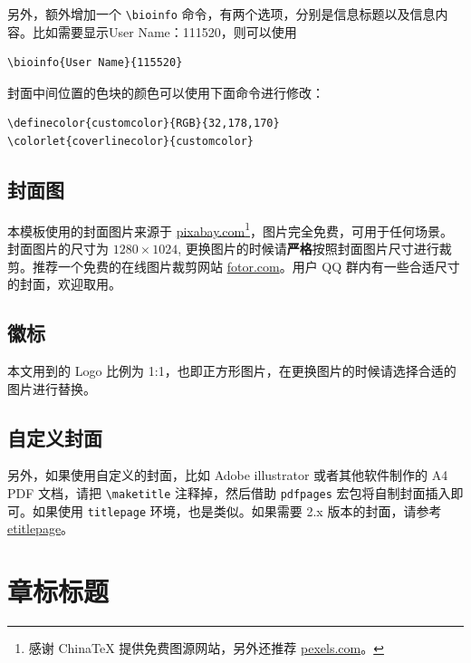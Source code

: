 \documentclass[lang=cn,newtx,10pt,scheme=chinese]{elegantbook}
\begin{document}
另外，额外增加一个 \lstinline{\bioinfo} 命令，有两个选项，分别是信息标题以及信息内容。比如需要显示{\kaishu User Name：111520}，则可以使用 
\begin{lstlisting}
\bioinfo{User Name}{115520}
\end{lstlisting}

封面中间位置的色块的颜色可以使用下面命令进行修改：
\begin{lstlisting}
\definecolor{customcolor}{RGB}{32,178,170}
\colorlet{coverlinecolor}{customcolor}
\end{lstlisting}

\subsection{封面图}

本模板使用的封面图片来源于 \href{https://pixabay.com/en/tea-time-poetry-coffee-reading-3240766/}{pixabay.com}\footnote{感谢 China\TeX{} 提供免费图源网站，另外还推荐 \href{https://www.pexels.com/}{pexels.com}。}，图片完全免费，可用于任何场景。封面图片的尺寸为 $1280 \times 1024$, 更换图片的时候请\textbf{严格}按照封面图片尺寸进行裁剪。推荐一个免费的在线图片裁剪网站 \href{https://www.fotor.com/cn}{fotor.com}。用户 QQ 群内有一些合适尺寸的封面，欢迎取用。

\subsection{徽标}

本文用到的 Logo 比例为 1:1，也即正方形图片，在更换图片的时候请选择合适的图片进行替换。

\subsection{自定义封面}

另外，如果使用自定义的封面，比如 Adobe illustrator 或者其他软件制作的 A4 PDF 文档，请把 \lstinline{\maketitle} 注释掉，然后借助 \lstinline{pdfpages} 宏包将自制封面插入即可。如果使用 \lstinline{titlepage} 环境，也是类似。如果需要 2.x 版本的封面，请参考 \href{https://github.com/EthanDeng/etitlepage}{etitlepage}。

\section{章标标题}
\end{document}

